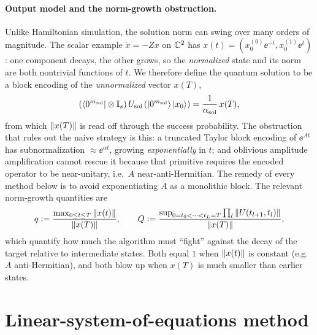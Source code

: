 \paragraph{Output model and the norm-growth obstruction.}
Unlike Hamiltonian simulation, the solution norm can swing over many orders of magnitude. The
scalar example $\dot x=-Zx$ on $\mathbb{C}^2$ has $x(t)=(x_0^{(0)}\ee^{-t},x_0^{(1)}\ee^{t})$: one
component decays, the other grows, so the \emph{normalized} state and its norm are both
nontrivial functions of $t$. We therefore define the quantum solution to be a block encoding
of the \emph{unnormalized} vector $x(T)$,
\begin{equation}
  (\bra{0^{m_{\mathrm{sol}}}}\otimes\mathbb{I}_s)\,U_{\mathrm{sol}}\,(\ket{0^{m_{\mathrm{sol}}}}\ket{x_0})
  =\frac{1}{\alpha_{\mathrm{sol}}}\,x(T),
  \label{eq:lec13-output}
\end{equation}
from which $\left\lVert x(T) \right\rVert$ is read off through the success probability. The obstruction that
rules out the naive strategy is this: a truncated Taylor block encoding of $\ee^{At}$ has
subnormalization $\approx\ee^{\alpha t}$, growing \emph{exponentially} in $t$; and oblivious
amplitude amplification cannot rescue it because that primitive requires the encoded operator
to be near-unitary, i.e.\ $A$ near-anti-Hermitian. The remedy of every method below is to
avoid exponentiating $A$ as a monolithic block. The relevant norm-growth quantities are
\begin{equation}
  q\vcentcolon=\frac{\max_{0\le t\le T}\left\lVert x(t) \right\rVert}{\left\lVert x(T) \right\rVert},
  \qquad
  Q\vcentcolon=\frac{\sup_{0=t_0<\dots<t_L=T}\prod_{l}\left\lVert U(t_{l+1},t_l) \right\rVert}{\left\lVert x(T) \right\rVert},
  \label{eq:lec13-qQ}
\end{equation}
which quantify how much the algorithm must ``fight'' against the decay of the target relative to
intermediate states. Both equal $1$ when $\left\lVert x(t) \right\rVert$ is constant (e.g.\ $A$ anti-Hermitian),
and both blow up when $x(T)$ is much smaller than earlier states.

\section{Linear-system-of-equations method}
\label{sec:lec13-2}

